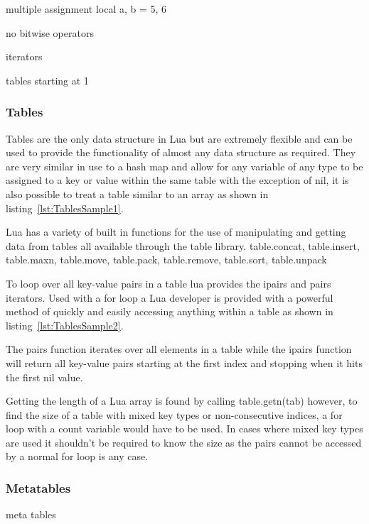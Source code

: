 \documentclass[11pt,a4paper,titlepage]{article}
\begin{document}
	multiple assignment local a, b = 5, 6

	no bitwise operators

	iterators

	tables starting at 1

\subsubsection{Tables}
	Tables are the only data structure in Lua but are extremely flexible and can be used to provide the functionality of almost any data structure as required. They are very similar in use to a hash map and allow for any variable of any type to be assigned to a key or value within the same table with the exception of nil, it is also possible to treat a table similar to an array as shown in listing~\ref{lst:TablesSample1}.
	

	Lua has a variety of built in functions for the use of manipulating and getting data from tables all available through the table library.
	table.concat, table.insert, table.maxn, table.move, table.pack, table.remove, table.sort, table.unpack

	To loop over all key-value pairs in a table lua provides the ipairs and pairs iterators. Used with a for loop a Lua developer is provided with a powerful method of quickly and easily accessing anything within a table as shown in listing~\ref{lst:TablesSample2}.
	

	The pairs function iterates over all elements in a table while the ipairs function will return all key-value pairs starting at the first index and stopping when it hits the first nil value.~\cite{Ierusalimschy:2013:PLT:2502646} 
	
	Getting the length of a Lua array is found by calling table.getn(tab) however, to find the size of a table with mixed key types or non-consecutive indices, a for loop with a count variable would have to be used. In cases where mixed key types are used it shouldn't be required to know the size as the pairs cannot be accessed by a normal for loop is any case.
	
\subsubsection{Metatables}
	meta tables
\end{document}

